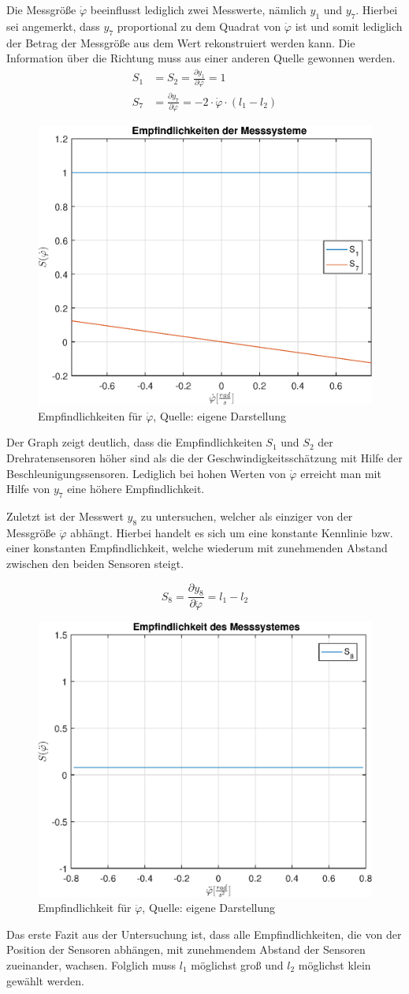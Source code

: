 Die Messgröße $\dot{\varphi}$ beeinflusst lediglich zwei Messwerte, nämlich $y_1$ und $y_7$. Hierbei sei angemerkt, dass $y_7$ proportional zu dem Quadrat von $\dot{\varphi}$ ist und somit lediglich der Betrag der Messgröße aus dem Wert rekonstruiert werden kann. Die Information über die Richtung muss aus einer anderen Quelle gewonnen werden. 
\begin{equation}
\begin{split}
S_1 &= S_2 = \frac{\partial y_1}{\partial \dot{\varphi}} = 1 \\
S_7 &= \frac{\partial y_7}{\partial \dot{\varphi}} = -2\cdot \dot{\varphi}\cdot (l_1 - l_2)
\end{split}
\end{equation}
\begin{figure}[h!]
\centering
\includegraphics[width=0.5\linewidth]{3_Sensorik/img/empfindlichkeit_phi__d}
\caption{Empfindlichkeiten für $\dot{\varphi}$, Quelle: eigene Darstellung}
\end{figure}
Der Graph zeigt deutlich, dass die Empfindlichkeiten $S_1$ und $S_2$ der Drehratensensoren höher sind als die der Geschwindigkeitsschätzung mit Hilfe der Beschleunigungssensoren. Lediglich bei hohen Werten von $\dot{\varphi}$ erreicht man mit Hilfe von $y_7$ eine höhere Empfindlichkeit.

\newpage
Zuletzt ist der Messwert $y_8$ zu untersuchen, welcher als einziger von der Messgröße $\ddot{\varphi}$ abhängt. Hierbei handelt es sich um eine konstante Kennlinie bzw. einer konstanten Empfindlichkeit, welche wiederum mit zunehmenden Abstand zwischen den beiden Sensoren steigt.

\begin{equation}
S_8 = \frac{\partial y_8}{\partial \ddot{\varphi}} = l_1 - l_2
\end{equation}

\begin{figure}[h!]
\centering
\includegraphics[width=0.5\linewidth]{3_Sensorik/img/empfindlichkeit_phi__dd}
\caption{Empfindlichkeit für $\ddot{\varphi}$, Quelle: eigene Darstellung}
\end{figure}

Das erste Fazit aus der Untersuchung ist, dass alle Empfindlichkeiten, die von der Position der Sensoren abhängen, mit zunehmendem Abstand der Sensoren zueinander, wachsen. Folglich muss $l_1$ möglichst groß und $l_2$ möglichst klein gewählt werden.